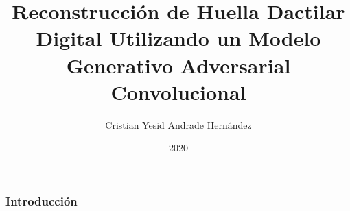 \documentclass{beamer}
\title{Reconstrucción de Huella Dactilar Digital Utilizando un Modelo Generativo Adversarial Convolucional}
\author{Cristian Yesid Andrade Hernández}
\institute{Universidad de los Andes}
\date{2020}
\begin{document}
\frame{\titlepage}

\begin{frame}
\frametitle{Introducción}



\end{frame}
\end{document}
